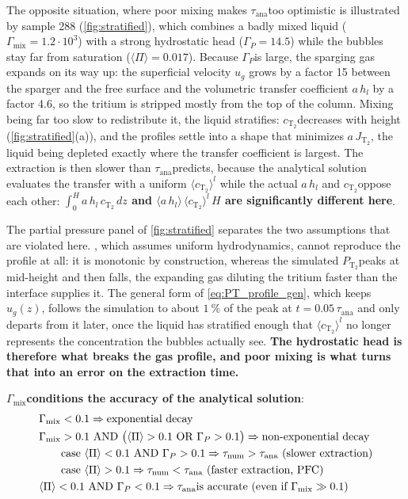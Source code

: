 \documentclass[a4paper,11pt,oneside]{report}
\newcommand{\PT}{\ensuremath{P_\mathrm{T_2}}}
\newcommand{\CT}{\ensuremath{c_\mathrm{T_2}}}
\newcommand{\JT}{\ensuremath{J_\mathrm{T_2}}}
\newcommand{\Tana}{\ensuremath{\tau_\mathrm{ana}}}
\newcommand{\Tnum}{\ensuremath{\tau_\mathrm{num}}}
\newcommand{\Gmix}{\ensuremath{\Gamma_\mathrm{mix}}}
\newcommand{\Gp}{\ensuremath{\Gamma_P}}
\newcommand{\PI}{\ensuremath{\langle \Pi \rangle}}
\newcounter{assumption}[chapter]
\newenvironment{keyresult}
  {\begin{tcolorbox}[colback=blue!5, colframe=blue!50!black, boxrule=0.5pt, arc=2pt]}
  {\end{tcolorbox}}
\begin{document}
The opposite situation, where poor mixing makes \Tana too optimistic is illustrated by sample 288 (\cref{fig:stratified}), which combines a badly mixed liquid ($\Gmix=1.2\cdot10^{3}$) with a strong hydrostatic head ($\Gp=14.5$) while the bubbles stay far from saturation ($\PI=0.017$). Because \Gp is large, the sparging gas expands on its way up: the superficial velocity $u_g$ grows by a factor 15 between the sparger and the free surface and the volumetric transfer coefficient $a\,h_l$ by a factor 4.6, so the tritium is stripped mostly from the top of the column. Mixing being far too slow to redistribute it, the liquid stratifies: \CT decreases with height (\cref{fig:stratified}(a)), and the profiles settle into a shape that minimizes $a\,\JT$, the liquid being depleted exactly where the transfer coefficient is largest. The extraction is then slower than \Tana predicts, because the analytical solution evaluates the transfer with a uniform $\langle\CT\rangle^l$ while the actual $a\,h_l$ and \CT oppose each other: \textbf{$\int_0^H a\,h_l\,\CT\,dz$ and $\langle a\,h_l\rangle\,\langle\CT\rangle^l\,H$ are significantly different here}.

The partial pressure panel of \cref{fig:stratified} separates the two assumptions that are violated here. , which assumes uniform hydrodynamics, cannot reproduce the profile at all: it is monotonic by construction, whereas the simulated \PT peaks at mid-height and then falls, the expanding gas diluting the tritium faster than the interface supplies it. The general form of \cref{eq:PT_profile_gen}, which keeps $u_g(z)$, follows the simulation to about $1\ \%$ of the peak at $t=0.05\,\Tana$ and only departs from it later, once the liquid has stratified enough that $\langle\CT\rangle^l$ no longer represents the concentration the bubbles actually see. \textbf{The hydrostatic head is therefore what breaks the gas profile, and poor mixing is what turns that into an error on the extraction time.}

\begin{keyresult}
    \textbf{\Gmix  conditions the accuracy of the analytical solution}:
    \begin{align*}
    &\Gmix<0.1 \Rightarrow \text{exponential decay} \\
    &\Gmix>0.1 \ \text{AND} \ \big(\PI>0.1 \ \text{OR} \ \Gp>0.1\big)\Rightarrow \text{non-exponential decay} \\
    &\qquad \text{case} \ \PI<0.1 \ \text{AND} \ \Gp>0.1 \Rightarrow \Tnum>\Tana \ \text{(slower extraction)}\\ 
    &\qquad \text{case} \ \PI>0.1 \Rightarrow \Tnum<\Tana \ \text{(faster extraction, PFC)} \\
    &\PI<0.1 \ \text{AND} \ \Gp<0.1 \Rightarrow \text{\Tana is accurate (even if $\Gmix\gg0.1$)}
    \end{align*}
\end{keyresult}
\end{document}
